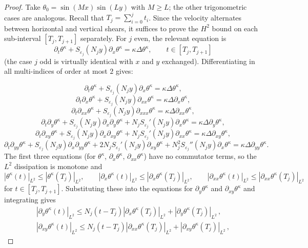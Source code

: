 \documentclass[12pt]{report}   %
\renewcommand{\le}{\leqslant}
\renewcommand{\ge}{\geqslant}
\numberwithin{equation}{section}
\theoremstyle{plain}
\theoremstyle{definition}
\theoremstyle{remark}
\newcommand{\eps}{{\varepsilon}}
\begin{document}
\begin{proof} Take $\theta_0 = \sin(Mx)\sin(Ly)$ with $M\ge L$; the other trigonometric cases are analogous. Recall that $T_j=\sum_{i=0}^j t_i$. Since the velocity alternates between horizontal and vertical shears, it suffices to prove the $H^2$ bound on each sub-interval $[T_j, T_{j+1}]$ separately. For $j$ even, the relevant equation is
\[\partial_t \theta^\kappa+S_{\eps_j}(N_j y)\partial_x \theta^\kappa=\kappa\Delta \theta^\kappa, \qquad t\in [T_j, T_{j+1}]\]
(the case $j$ odd is virtually identical with $x$ and $y$ exchanged). Differentiating in all multi-indices of order at most $2$ gives:

\[\partial_t  \theta^\kappa+S_{\eps_j}(N_j y)\partial_x \theta^\kappa=\kappa\Delta \theta^\kappa,\]
\[\partial_t \partial_x \theta^\kappa+S_{\eps_j}(N_j y)\partial_{xx} \theta^\kappa=\kappa\Delta\partial_x \theta^\kappa,\]
\[\partial_t \partial_{xx} \theta^\kappa+S_{\eps_j}(N_j y)\partial_{xxx} \theta^\kappa=\kappa\Delta   \partial_{xx}\theta^\kappa,\]
\[\partial_t \partial_y \theta^\kappa+S_{\eps_j}(N_j y)\partial_x \partial_y \theta^\kappa+N_j S_{\eps_j}'(N_j y)\partial_x \theta^\kappa=\kappa\Delta \partial_y \theta^\kappa,\]
\[\partial_t \partial_{xy} \theta^\kappa+S_{\eps_j}(N_j y)\partial_{x}\partial_{xy} \theta^\kappa+N_j S_{\eps_j}'(N_j y)\partial_{xx} \theta^\kappa=\kappa\Delta \partial_{xy}\theta^\kappa,\]
\[\partial_t \partial_{yy} \theta^\kappa+S_{\eps_j}(N_j y)\partial_x \partial_{yy} \theta^\kappa+2N_j S_{\eps_j}'(N_j y)\partial_{xy} \theta^\kappa+N_j^2 S_{\eps_j}''(N_j y)\partial_x \theta^\kappa=\kappa\Delta \partial_{yy} \theta^\kappa.\]
The first three equations (for $\theta^\kappa$, $\partial_x\theta^\kappa$, $\partial_{xx}\theta^\kappa$) have no commutator terms, so the $L^2$ dissipation is monotone and
\[|\theta^\kappa(t)|_{L^2}\le |\theta^\kappa(T_{j})|_{L^2},\qquad |\partial_x \theta^\kappa(t)|_{L^2}\le |\partial_x \theta^\kappa(T_{j})|_{L^2}, \qquad |\partial_{xx}\theta^\kappa(t)|_{L^2}\le |\partial_{xx}\theta^\kappa(T_{j})|_{L^2}\]
for $t\in [T_j, T_{j+1}]$. Substituting these into the equations for $\partial_y\theta^\kappa$ and $\partial_{xy}\theta^\kappa$ and integrating gives
\begin{gather}
  |\partial_y \theta^\kappa(t)|_{L^2}\le N_j (t-T_j)|\partial_x \theta^\kappa(T_j)|_{L^2}+|\partial_y \theta^\kappa(T_j)|_{L^2}\,,
  \\
  |\partial_{xy} \theta^\kappa(t)|_{L^2}\le N_j (t-T_j)|\partial_{xx} \theta^\kappa(T_j)|_{L^2}+|\partial_{xy} \theta^\kappa(T_j)|_{L^2}\,,
\end{gather}

\end{proof}
\end{document}
